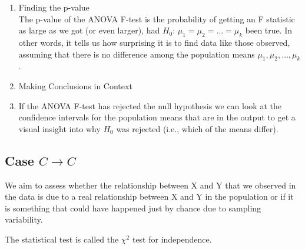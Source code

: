 \documentclass[10pt, a4paper]{article}
\begin{document}
\begin{enumerate}
\item Finding the p-value\\
The p-value of the ANOVA F-test is the probability of getting an F statistic as large as we got (or even larger), had $H_0: \, \mu_1=\mu_2=\dots=\mu_k$
been true. In other words, it tells us how surprising it is to find data like those observed, assuming that there is no difference among the population means $\mu_1, \mu_2, \dots, \mu_k$.
\item Making Conclusions in Context
\item 
If the ANOVA F-test has rejected the null hypothesis we can look at the confidence intervals for the population means that are in the output to get a visual insight into why $H_0$ was rejected (i.e., which of the means differ).
\end{enumerate}
\subsection{Case $ C\rightarrow C$ }
We aim to assess whether the relationship between X and Y that we observed in the data is due to a real relationship between X and Y in the population or if it is something that could have happened just by chance due to sampling variability.\par
The statistical test is called the $\chi^2$ test for independence.
\end{document}
